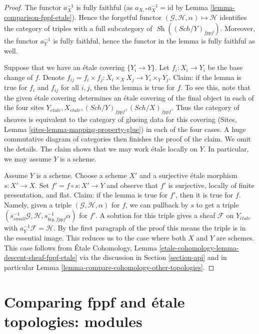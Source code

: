 \documentclass{stacks-project}
\theoremstyle{plain}
\theoremstyle{definition}
\theoremstyle{remark}
\numberwithin{equation}{subsection}
\def\Sch{\mathit{Sch}}
\def\Sh{\mathop{\mathit{Sh}}\nolimits}
\def\etale{{\acute{e}tale}}
\begin{document}
\begin{proof}
The functor $a_X^{-1}$ is fully faithful (as $a_{X, *}a_X^{-1} = \text{id}$ by
Lemma \ref{lemma-comparison-fppf-etale}). Hence the forgetful functor
$(\mathcal{G}, \mathcal{H}, \alpha) \mapsto \mathcal{H}$ identifies the
category of triples with a full subcategory of $\Sh((\Sch/Y)_{fppf})$.
Moreover, the functor $a_Y^{-1}$ is fully faithful, hence the functor
in the lemma is fully faithful as well.

\medskip\noindent
Suppose that we have an \'etale covering $\{Y_i \to Y\}$.
Let $f_i : X_i \to Y_i$ be the base change of $f$.
Denote $f_{ij} = f_i \times f_j : X_i \times_X X_j  \to Y_i \times_Y Y_j$.
Claim: if the lemma is true for $f_i$ and $f_{ij}$ for all $i, j$, then
the lemma is true for $f$. To see this, note that the given \'etale covering
determines an \'etale covering of the final object in each of
the four sites $Y_\etale, X_\etale, (\Sch/Y)_{fppf}, (\Sch/X)_{fppf}$.
Thus the category of sheaves is equivalent to the category of
glueing data for this covering
(Sites, Lemma \ref{sites-lemma-mapping-property-glue})
in each of the four cases. A huge commutative diagram of
categories then finishes the proof of the claim. We omit the details.
The claim shows that we may work \'etale locally on $Y$.
In particular, we may assume $Y$ is a scheme.

\medskip\noindent
Assume $Y$ is a scheme. Choose a scheme $X'$ and a surjective \'etale
morphism $s : X' \to X$. Set $f' = f \circ s : X' \to Y$ and observe
that $f'$ is surjective, locally of finite presentation, and flat.
Claim: if the lemma is true for $f'$, then it is true for $f$.
Namely, given a triple $(\mathcal{G}, \mathcal{H}, \alpha)$
for $f$, we can pullback by $s$ to get a triple
$(s_{small}^{-1}\mathcal{G}, \mathcal{H}, s_{big, fppf}^{-1}\alpha)$
for $f'$. A solution for this triple gives a sheaf
$\mathcal{F}$ on $Y_\etale$ with $a_Y^{-1}\mathcal{F} = \mathcal{H}$.
By the first paragraph of the proof this means the triple is
in the essential image. This reduces us to the case
where both $X$ and $Y$ are schemes. This case follows from
\'Etale Cohomology, Lemma
\ref{etale-cohomology-lemma-descent-sheaf-fppf-etale}
via the discussion in Section \ref{section-api}
and in particular Lemma \ref{lemma-compare-cohomology-other-topologies}.
\end{proof}



\section{Comparing fppf and \'etale topologies: modules}
\label{section-fppf-etale-modules}
\end{document}
